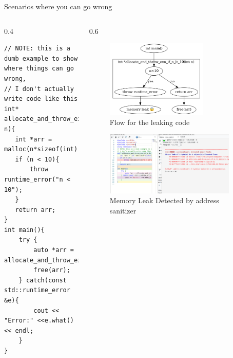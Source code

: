 \documentclass[
  10pt,
  ignorenonframetext,
]{beamer}
\begin{document}
\begin{frame}[fragile]{Scenarios where you can go
wrong}
\protect\hypertarget{scenarios-where-you-can-go-wrong}{}
\begin{columns}[T]
\begin{column}{0.4\textwidth}
\vspace{30pt}
\tiny

\begin{verbatim}
// NOTE: this is a dumb example to show where things can go wrong,
// I don't actually write code like this
int* allocate_and_throw_exn_if_n_lt_10(int n){
   int *arr = malloc(n*sizeof(int));
   if (n < 10){
       throw runtime_error("n < 10");
   }
   return arr;
}
int main(){
    try {
        auto *arr = allocate_and_throw_exn_if_n_lt_10(2);
        free(arr);
    } catch(const std::runtime_error &e){
        cout << "Error:" <<e.what() << endl;
    }
}
\end{verbatim}

\normalsize
\end{column}

\begin{column}{0.6\textwidth}
\begin{figure}
\centering
\includegraphics[width=0.7\textwidth,height=\textheight]{images/mem_management_leak_scenario1.png}
\caption{Flow for the leaking code}
\end{figure}

\begin{figure}
\centering
\includegraphics[width=0.9\textwidth,height=\textheight]{images/./leak_detected.png}
\caption{Memory Leak Detected by address
sanitizer}
\end{figure}
\end{column}
\end{columns}
\end{frame}
\end{document}
